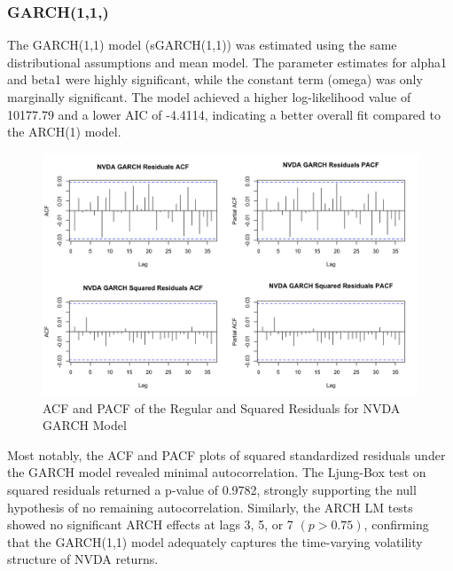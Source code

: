 \documentclass[12pt]{article}
\begin{document}
\subsubsection*{GARCH(1,1,)}

The GARCH(1,1) model (sGARCH(1,1)) was estimated using the same distributional assumptions and mean model. The parameter estimates for alpha1 and beta1 were highly significant, while the constant term (omega) was only marginally significant. The model achieved a higher log-likelihood value of 10177.79 and a lower AIC of -4.4114, indicating a better overall fit compared to the ARCH(1) model.

\begin{figure}[!h]
	\centering
	\includegraphics[width=0.8\linewidth]{plots/GARCH_NVDA.png}
	\caption{ACF and PACF of the Regular and Squared Residuals for NVDA GARCH Model}
	\label{fig:garch_nvda}
\end{figure}

Most notably, the ACF and PACF plots of squared standardized residuals under the GARCH model revealed minimal autocorrelation. The Ljung-Box test on squared residuals returned a p-value of 0.9782, strongly supporting the null hypothesis of no remaining autocorrelation. Similarly, the ARCH LM tests showed no significant ARCH effects at lags 3, 5, or 7 $(p > 0.75 )$, confirming that the GARCH(1,1) model adequately captures the time-varying volatility structure of NVDA returns.
\end{document}
